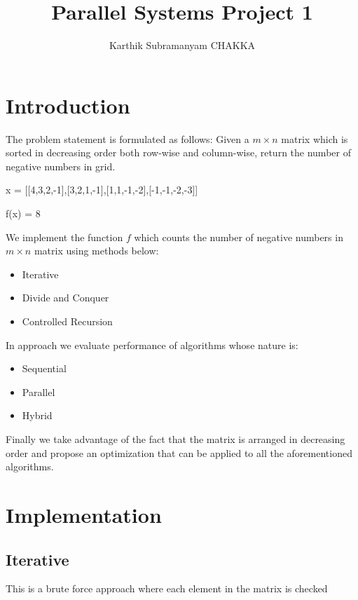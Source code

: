 \documentclass{article}
\begin{document}
\title{Parallel Systems Project 1}
\author{Karthik Subramanyam CHAKKA}
\date{}

\maketitle

\section{Introduction}
The problem statement is formulated as follows:
Given a $m \times n$ matrix which is sorted in decreasing order both row-wise and column-wise, return the number of negative numbers in grid.

\begin{center}
x = [[4,3,2,-1],[3,2,1,-1],[1,1,-1,-2],[-1,-1,-2,-3]]    
\end{center}
\begin{center}
f(x) = 8
\end{center}

We implement the function $f$ which counts the number of negative numbers in $m \times n$ matrix using methods below:
\begin{itemize}
    \item Iterative
    \item Divide and Conquer
    \item Controlled Recursion
\end{itemize}

In approach we evaluate performance of algorithms whose nature is:
\begin{itemize}
    \item Sequential
    \item Parallel
    \item Hybrid
\end{itemize}

Finally we take advantage of the fact that the matrix is arranged in decreasing order and propose an optimization that can be applied to all the aforementioned algorithms.

\section{Implementation}


\subsection{Iterative}

This is a brute force approach where each element in the matrix is checked 
\end{document}
